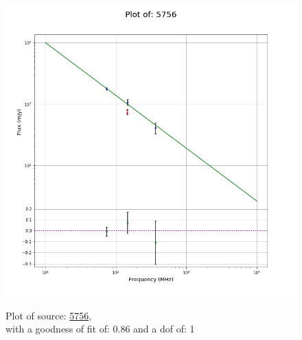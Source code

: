 \documentclass{article}
\begin{document}
\begin{figure}[H]
\begin{minipage}{0.5\textwidth}
        \includegraphics[scale = 0.35]{KmeulenSimSource_1hr/1hr5756.png}
        \captionsetup{labelformat=empty}
        \caption{Plot of source: \href{http://banana.transientskp.org/r4/vlo_KmeulenSimSource/runningcatalog/5756}{5756},\\with a goodness of fit of: 0.86 and a dof of: 1}
    \addtocounter{figure}{-1}
    \label{KmeulenSimSource:1hr:5756:plot}
    \end{minipage}
\end{figure}
\end{document}
